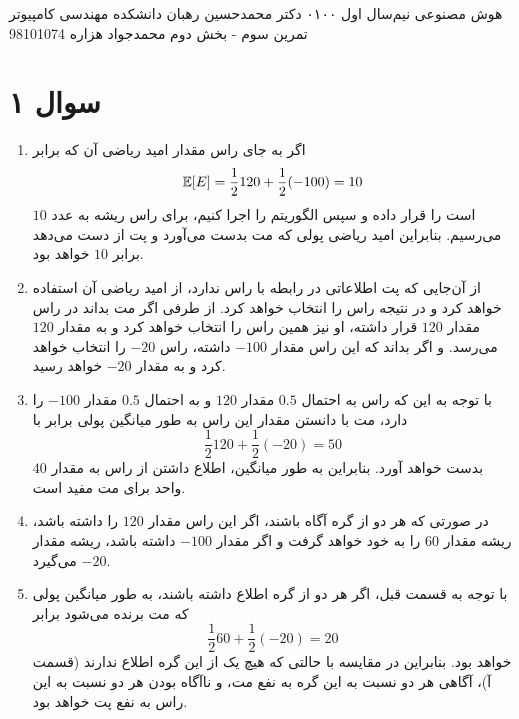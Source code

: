 \documentclass[a4paper, 12pt]{article}
\begin{document}
\handout
{هوش مصنوعی}
{نیم‌سال اول ۰۱\lr{-}۰۰}
{دکتر محمدحسین رهبان}
{دانشکده مهندسی کامپیوتر}
{تمرین سوم - بخش دوم}
{محمدجواد هزاره}
{98101074}
\noindent
\\[-6em]
\section*{سوال ۱}
\begin{enumerate}[آ)]
	\item
	اگر به جای راس  مقدار امید ریاضی آن که برابر 
	\[
	{\mathbb E}[E] = \frac{1}{2} 120 + \frac{1}{2}(-100) = 10
	\]
	است را قرار داده و سپس الگوریتم  را اجرا کنیم، برای راس ریشه به عدد $10$ می‌رسیم. بنابراین امید ریاضی پولی که مت بدست می‌آورد و پت از دست می‌دهد برابر $10$ خواهد بود.
	\item
	از آن‌جایی که پت اطلاعاتی در رابطه با راس  ندارد، از امید ریاضی آن استفاده خواهد کرد و در نتیجه راس  را انتخاب خواهد کرد. از طرفی اگر مت بداند در راس  مقدار $120$ قرار داشته، او نیز همین راس را انتخاب خواهد کرد و به مقدار $120$ می‌رسد. و اگر بداند که این راس مقدار $-100$ داشته، راس $-20$ را انتخاب خواهد کرد و به مقدار $-20$ خواهد رسید.
	\item
	با توجه به این که راس  به احتمال $0.5$ مقدار $120$ و به احتمال $0.5$ مقدار $-100$ را دارد، مت با دانستن مقدار این راس به طور میانگین پولی برابر با
	\[
	\frac{1}{2} 120 + \frac{1}{2}(-20) = 50
	\]
	بدست خواهد آورد. بنابراین به طور میانگین، اطلاع داشتن از راس  به مقدار $40$ واحد برای مت مفید است.
	\item
	در صورتی که هر دو از گره  آگاه باشند، اگر این راس مقدار $120$ را داشته باشد، ریشه مقدار $60$ را به خود خواهد گرفت و اگر مقدار $-100$ داشته باشد، ریشه مقدار $-20$ می‌گیرد.
	\item
	با توجه به قسمت قبل، اگر هر دو از گره  اطلاع داشته باشند، به طور میانگین پولی که مت برنده می‌شود برابر
	\[
	\frac{1}{2} 60 + \frac{1}{2} (-20) = 20
	\]
	خواهد بود. بنابراین در مقایسه با حالتی که هیچ یک از این گره اطلاع ندارند (قسمت آ)، آگاهی هر دو نسبت به این گره به نفع مت، و ناآگاه بودن هر دو نسبت به این راس به نفع پت خواهد بود.
\end{enumerate}
\end{document}
